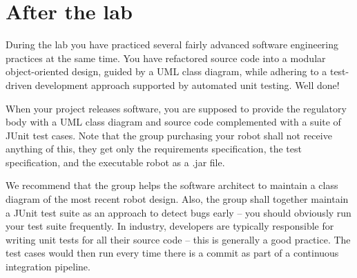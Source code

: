 \documentclass{scrreprt}
\begin{document}
\newpage

\chapter{After the lab}
During the lab you have practiced several fairly advanced software engineering practices at the same time. You have refactored source code into a modular object-oriented design, guided by a UML class diagram, while adhering to a test-driven development approach supported by automated unit testing. Well done!

When your project releases software, you are supposed to provide the regulatory body with a UML class diagram and source code complemented with a suite of JUnit test cases. Note that the group purchasing your robot shall not receive anything of this, they get only the requirements specification, the test specification, and the executable robot as a .jar file.

We recommend that the group helps the software architect to maintain a class diagram of the most recent robot design. Also, the group shall together maintain a JUnit test suite as an approach to detect bugs early -- you should obviously run your test suite frequently. In industry, developers are typically responsible for writing unit tests for all their source code -- this is generally a good practice. The test cases would then run every time there is a commit as part of a continuous integration pipeline.
\end{document}

